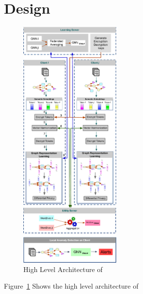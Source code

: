 \section{\Sys Design}
\label{sec:methodology}

\begin{figure}[t!]
    \centering
    \includegraphics[width=0.45\textwidth]{fig/arch.pdf}
    \caption{High Level Architecture of \Sys}
    \vspace{-3ex}
    \label{arch}
  \end{figure}
  
  Figure~\ref{arch} Shows the high level architecture of \Sys